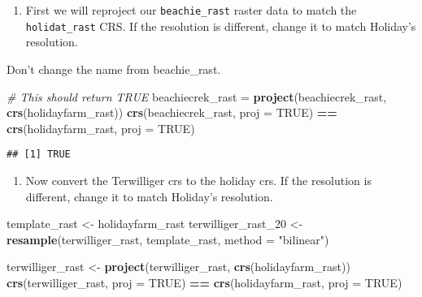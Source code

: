 \documentclass[
]{article}
\newenvironment{Shaded}{\begin{snugshade}}{\end{snugshade}}
\newcommand{\AttributeTok}[1]{\textcolor[rgb]{0.13,0.29,0.53}{#1}}
\newcommand{\CommentTok}[1]{\textcolor[rgb]{0.56,0.35,0.01}{\textit{#1}}}
\newcommand{\ConstantTok}[1]{\textcolor[rgb]{0.56,0.35,0.01}{#1}}
\newcommand{\FunctionTok}[1]{\textcolor[rgb]{0.13,0.29,0.53}{\textbf{#1}}}
\newcommand{\NormalTok}[1]{#1}
\newcommand{\OtherTok}[1]{\textcolor[rgb]{0.56,0.35,0.01}{#1}}
\newcommand{\SpecialCharTok}[1]{\textcolor[rgb]{0.81,0.36,0.00}{\textbf{#1}}}
\newcommand{\StringTok}[1]{\textcolor[rgb]{0.31,0.60,0.02}{#1}}
\providecommand{\tightlist}{%
  \setlength{\itemsep}{0pt}\setlength{\parskip}{0pt}}
\begin{document}
\begin{enumerate}
\def\labelenumi{\alph{enumi}.}
\tightlist
\item
  First we will reproject our \texttt{beachie\_rast} raster data to
  match the \texttt{holidat\_rast} CRS. If the resolution is different,
  change it to match Holiday's resolution.
\end{enumerate}

Don't change the name from beachie\_rast.

\begin{Shaded}
\begin{Highlighting}[]
\CommentTok{\# This should return TRUE}
\NormalTok{beachiecrek\_rast }\OtherTok{=} \FunctionTok{project}\NormalTok{(beachiecrek\_rast, }\FunctionTok{crs}\NormalTok{(holidayfarm\_rast))}
\FunctionTok{crs}\NormalTok{(beachiecrek\_rast, }\AttributeTok{proj =} \ConstantTok{TRUE}\NormalTok{) }\SpecialCharTok{==} \FunctionTok{crs}\NormalTok{(holidayfarm\_rast, }\AttributeTok{proj =} \ConstantTok{TRUE}\NormalTok{)}
\end{Highlighting}
\end{Shaded}

\begin{verbatim}
## [1] TRUE
\end{verbatim}

\begin{enumerate}
\def\labelenumi{\alph{enumi}.}
\setcounter{enumi}{1}
\tightlist
\item
  Now convert the Terwilliger crs to the holiday crs. If the resolution
  is different, change it to match Holiday's resolution.
\end{enumerate}

\begin{Shaded}
\begin{Highlighting}[]
\NormalTok{template\_rast }\OtherTok{\textless{}{-}}\NormalTok{ holidayfarm\_rast}
\NormalTok{terwilliger\_rast\_20 }\OtherTok{\textless{}{-}} \FunctionTok{resample}\NormalTok{(terwilliger\_rast, template\_rast, }\AttributeTok{method =} \StringTok{"bilinear"}\NormalTok{)}

\NormalTok{terwilliger\_rast }\OtherTok{\textless{}{-}} \FunctionTok{project}\NormalTok{(terwilliger\_rast, }\FunctionTok{crs}\NormalTok{(holidayfarm\_rast))}
\FunctionTok{crs}\NormalTok{(terwilliger\_rast, }\AttributeTok{proj =} \ConstantTok{TRUE}\NormalTok{) }\SpecialCharTok{==} \FunctionTok{crs}\NormalTok{(holidayfarm\_rast, }\AttributeTok{proj =} \ConstantTok{TRUE}\NormalTok{)}
\end{Highlighting}
\end{Shaded}
\end{document}
